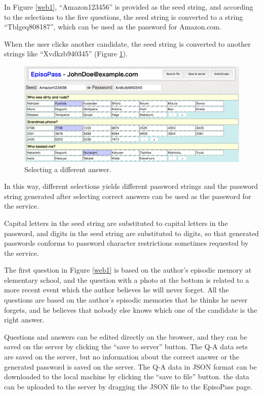 \documentclass[runningheads,a4paper]{llncs}
\begin{document}

In Figure \ref{web1},
``\textsf{Amazon123456}'' is provided as the seed string,
and according to the selections to the five questions,
the seed string is converted to a string
``\textsf{Tblgeq808187}'',
which can be used as the password for Amazon.com.

When the user clicks another candidate,
the seed string is converted to another strings like
``\textsf{Xvdkzb940345}'' (Figure \ref{web11}).

\begin{figure}[H]
\centering
\includegraphics[width=1.0\columnwidth]{figures/8447eaba1ede0f678b3ce6fea63681f3}
\caption{Selecting a different answer.}
\label{web11}
\end{figure}

In this way, different selections yields different password strings and
the password string generated after selecting correct answers can be
used as the password for the service.

Capital letters in the seed string are substituted to capital letters in the password,
and digits in the seed string are substituted to digits,
so that generated passwords conforms to password character restrictions
sometimes requested by the service.

The first question in Figure \ref{web1}
is based on the author's episodic memory at elementary school,
and the question with a photo at the bottom is related to a more recent event
which the author believes he will never forget.
All the questions are based on the author's episodic memories
that he thinks he never forgets, and he believes that
nobody else knows which one of the candidate is the right answer.

Questions and answers can be edited directly on the browser, and they can be
saved on the server by clicking the ``save to server'' button.
The Q-A data sets are saved on the server,
but no information about the correct answer or the
generated password is saved on the server.
The Q-A data in JSON format can be downloaded to the local machine
by clicking the ``save to file'' button.
the data can be uploaded to the server by dragging the JSON file to the EpisoPass page.
\end{document}
